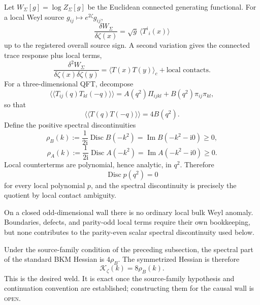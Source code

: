 \documentclass[11pt]{article}
\numberwithin{equation}{section}
\newcommand{\ii}{\mathrm i}
\newcommand{\Disc}{\operatorname{Disc}}
\newcommand{\Kz}{\mathcal K_\zeta}
\newcommand{\status}[1]{\textsc{\footnotesize #1}}
\theoremstyle{definition}
\theoremstyle{remark}
\begin{document}
Let $W_\Sigma[g]=\log Z_\Sigma[g]$ be the Euclidean connected generating functional. For a local Weyl source $g_{ij}\mapsto e^{2\zeta}g_{ij}$,
\begin{equation}
\frac{\delta W_\Sigma}{\delta\zeta(x)}
=\sqrt g\,\langle T^i{}_i(x)\rangle
\end{equation}
up to the registered overall source sign. A second variation gives the connected trace response plus local terms,
\begin{equation}
\frac{\delta^2 W_\Sigma}{\delta\zeta(x)\delta\zeta(y)}
=\langle T(x)T(y)\rangle_c+\text{local contacts}.
\end{equation}
For a three-dimensional QFT, decompose
\begin{equation}
\langle\!\langle T_{ij}(q)T_{kl}(-q)\rangle\!\rangle
=A(q^2)\Pi_{ijkl}+B(q^2)\pi_{ij}\pi_{kl},
\end{equation}
so that
\begin{equation}
\langle\!\langle T(q)T(-q)\rangle\!\rangle=4B(q^2).
\end{equation}
Define the positive spectral discontinuities
\begin{equation}
\rho_B(k):=\frac{1}{2\ii}\Disc B(-k^2)
=\operatorname{Im}B(-k^2-\ii0)\ge0,
\end{equation}
\begin{equation}
\rho_A(k):=\frac{1}{2\ii}\Disc A(-k^2)
=\operatorname{Im}A(-k^2-\ii0)\ge0.
\end{equation}
Local counterterms are polynomial, hence analytic, in $q^2$. Therefore
\begin{equation}
\Disc p(q^2)=0
\end{equation}
for every local polynomial $p$, and the spectral discontinuity is precisely the quotient by local contact ambiguity.

On a closed odd-dimensional wall there is no ordinary local bulk Weyl anomaly. Boundaries, defects, and parity-odd local terms require their own bookkeeping, but none contributes to the parity-even scalar spectral discontinuity used below.

Under the source-family condition of the preceding subsection, the spectral part of the standard BKM Hessian is $4\rho_B$. The symmetrized Hessian is therefore
\begin{equation}
\boxed{\Kz(k)=8\rho_B(k).}
\label{eq:weld}
\end{equation}
This is the desired weld. It is exact once the source-family hypothesis and continuation convention are established; constructing them for the causal wall is \status{open}.
\end{document}
